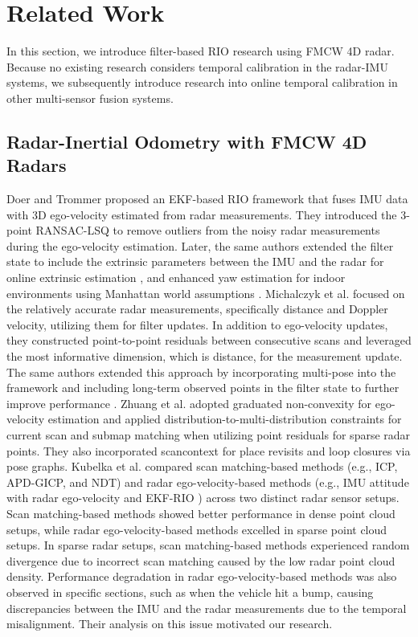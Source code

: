\section{Related Work}
\label{sec: related work}
In this section, we introduce filter-based RIO research using FMCW 4D radar. Because no existing research considers temporal calibration in the radar-IMU systems, we subsequently introduce research into online temporal calibration in other multi-sensor fusion systems.

\subsection{Radar-Inertial Odometry with FMCW 4D Radars}
Doer and Trommer \cite{9235254} proposed an EKF-based RIO framework that fuses IMU data with 3D ego-velocity estimated from radar measurements. They introduced the 3-point RANSAC-LSQ to remove outliers from the noisy radar measurements during the ego-velocity estimation. Later, the same authors extended the filter state to include the extrinsic parameters between the IMU and the radar for online extrinsic estimation \cite{9317343}, and enhanced yaw estimation for indoor environments using Manhattan world assumptions \cite{9470842}. Michalczyk et al. \cite{9981396} focused on the relatively accurate radar measurements, specifically distance and Doppler velocity, utilizing them for filter updates. In addition to ego-velocity updates, they constructed point-to-point residuals between consecutive scans and leveraged the most informative dimension, which is distance, for the measurement update. The same authors extended this approach by incorporating multi-pose into the framework and including long-term observed points in the filter state to further improve performance \cite{10160482}. Zhuang et al. \cite{10100861} adopted graduated non-convexity for ego-velocity estimation and applied distribution-to-multi-distribution constraints for current scan and submap matching when utilizing point residuals for sparse radar points. They also incorporated scancontext for place revisits and loop closures via pose graphs. Kubelka et al. \cite{10610666} compared scan matching-based methods (e.g., ICP, APD-GICP, and NDT) and radar ego-velocity-based methods (e.g., IMU attitude with radar ego-velocity and EKF-RIO \cite{9235254}) across two distinct radar sensor setups. Scan matching-based methods showed better performance in dense point cloud setups, while radar ego-velocity-based methods excelled in sparse point cloud setups. In sparse radar setups, scan matching-based methods experienced random divergence due to incorrect scan matching caused by the low radar point cloud density. Performance degradation in radar ego-velocity-based methods was also observed in specific sections, such as when the vehicle hit a bump, causing discrepancies between the IMU and the radar measurements due to the temporal misalignment. Their analysis on this issue motivated our research.

